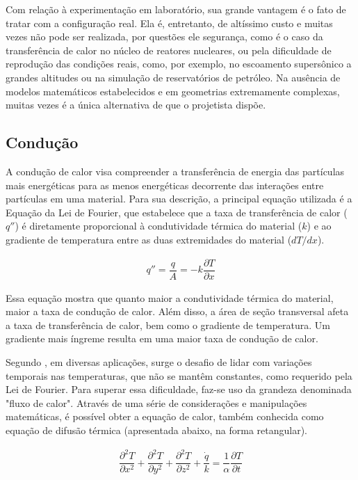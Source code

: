 Com relação à experimentação em laboratório, sua grande vantagem é o fato de tratar com a configuração real. Ela é, entretanto, de altíssimo custo e muitas vezes não pode ser realizada, por questões ele segurança, como é o caso da transferência de calor no núcleo de reatores nucleares, ou pela dificuldade de reprodução das condições reais, como, por exemplo, no escoamento supersônico a grandes altitudes ou na simulação de reservatórios de petróleo. Na ausência de modelos matemáticos estabelecidos e em geometrias extremamente complexas, muitas vezes é a única alternativa de que o projetista dispõe.

\subsection{Condução}

A condução de calor visa compreender a transferência de energia das partículas mais energéticas para as menos energéticas decorrente das interações entre partículas em uma material. Para sua descrição, a principal equação utilizada é a Equação da Lei de Fourier, que estabelece que a taxa de transferência de calor (\(q ''\)) é diretamente proporcional à condutividade térmica do material (\(k\)) e ao gradiente de temperatura entre as duas extremidades do material (\( dT / dx \)).

\begin{gather}
    q '' = \dfrac{q}{A} = - k \dfrac{\partial T}{\partial x}
\end{gather}

Essa equação mostra que quanto maior a condutividade térmica do material, maior a taxa de condução de calor. Além disso, a área de seção transversal afeta a taxa de transferência de calor, bem como o gradiente de temperatura. Um gradiente mais íngreme resulta em uma maior taxa de condução de calor.

Segundo \citet{figueiredo2018}, em diversas aplicações, surge o desafio de lidar com variações temporais nas temperaturas, que não se mantêm constantes, como requerido pela Lei de Fourier. Para superar essa dificuldade, faz-se uso da grandeza denominada "fluxo de calor". Através de uma série de considerações e manipulações matemáticas, é possível obter a equação de calor, também conhecida como equação de difusão térmica (apresentada abaixo, na forma retangular).

\begin{gather}
    \dfrac{\partial ^2 T}{\partial x ^2} + \dfrac{\partial ^2 T}{\partial y ^2} + \dfrac{\partial ^2 T}{\partial z ^2} + \dfrac{\dot{q}}{k} = \dfrac{1}{\alpha} \dfrac{\partial T}{\partial t}
\end{gather}

